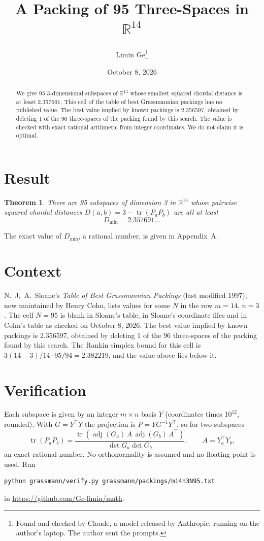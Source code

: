 \documentclass[11pt,a4paper]{article}
\title{A Packing of 95 Three-Spaces in $\mathbb{R}^{14}$}
\author{Limin Ge\thanks{Found and checked by Claude, a model released by Anthropic, running on the author's laptop. The author sent the prompts.}}
\date{October 8, 2026}
\newtheorem*{theorem}{Theorem}
\begin{document}
\maketitle
\begin{abstract}
We give 95 3-dimensional subspaces of $\mathbb{R}^{14}$ whose smallest squared chordal distance is at least 2.357691. This cell of the table of best Grassmannian packings has no published value. The best value implied by known packings is 2.356597, obtained by deleting 1 of the 96 three-spaces of the packing found by this search. The value is checked with exact rational arithmetic from integer coordinates. We do not claim it is optimal.
\end{abstract}

\section{Result}
\begin{theorem}
There are 95 subspaces of dimension 3 in $\mathbb{R}^{14}$ whose pairwise squared chordal distances $D(a,b) = 3 - \operatorname{tr}(P_aP_b)$ are all at least
\[ D_{\min} = 2.357691\ldots \]
\end{theorem}
The exact value of $D_{\min}$, a rational number, is given in Appendix~A.


\section{Context}
N.~J.~A.~Sloane's \emph{Table of Best Grassmannian Packings} (last modified 1997), now maintained by Henry Cohn, lists values for some $N$ in the row $m=14$, $n=3$. The cell $N=95$ is blank in Sloane's table, in Sloane's coordinate files and in Cohn's table as checked on October 8, 2026. The best value implied by known packings is 2.356597, obtained by deleting 1 of the 96 three-spaces of the packing found by this search. The Rankin simplex bound for this cell is $3(14-3)/14\cdot 95/94 = 2.382219$, and the value above lies below it.


\section{Verification}
Each subspace is given by an integer $m\times n$ basis $Y$ (coordinates times $10^{12}$, rounded). With $G=Y^\top Y$ the projection is $P=YG^{-1}Y^\top$, so for two subspaces
\[ \operatorname{tr}(P_aP_b)=\frac{\operatorname{tr}(\operatorname{adj}(G_a)\,A\,\operatorname{adj}(G_b)\,A^\top)}{\det G_a\det G_b},\qquad A=Y_a^\top Y_b, \]
an exact rational number. No orthonormality is assumed and no floating point is used. Run
\begin{verbatim}
python grassmann/verify.py grassmann/packings/m14n3N95.txt
\end{verbatim}
in \url{https://github.com/Ge-limin/math}.
\end{document}
